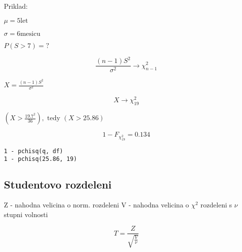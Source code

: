 \documentclass{article}
\begin{document}
Priklad:

$\mu = 5 \text{let}$

$\sigma = 6 \text{mesicu}$

$P(S > 7) = ?$

\[ \frac{(n-1) S^2}{\sigma^2} \rightarrow \chi^2_{n-1} \]

$X = \frac{(n-1)S^2}{\sigma^2}$

\[ X \rightarrow \chi_{19}^2 \]

$(X > \frac{19.7^2}{36}), \text{ tedy } (X > 25.86)$

\[ 1 - F_{\chi_{19}^2} = 0.134 \]

\begin{verbatim}
1 - pchisq(q, df)
1 - pchisq(25.86, 19)
\end{verbatim}

\subsection{Studentovo rozdeleni}

Z - nahodna velicina o norm. rozdeleni
V - nahodna velicina o $\chi^2$ rozdeleni s $\nu$ stupni volnosti

\[ T = \frac{Z}{\sqrt{\frac{V} {\nu}}} \]
\end{document}
